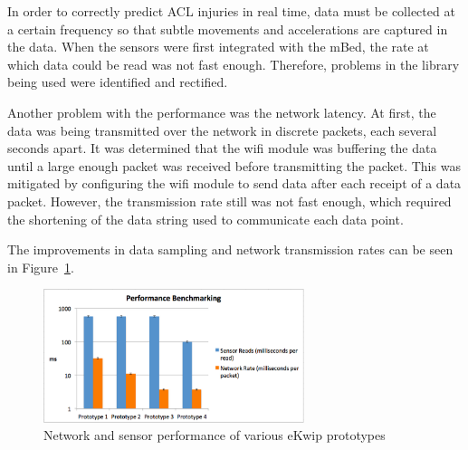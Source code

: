 In order to correctly predict ACL injuries in real time, data must be collected at a certain frequency so that subtle movements and accelerations are captured in the data. When the sensors were first integrated with the mBed, the rate at which data could be read was not fast enough. Therefore, problems in the library being used were identified and rectified.

Another problem with the performance was the network latency. At first, the data was being transmitted over the network in discrete packets, each several seconds apart. It was determined that the wifi module was buffering the data until a large enough packet was received before transmitting the packet. This was mitigated by configuring the wifi module to send data after each receipt of a data packet. However, the transmission rate still was not fast enough, which required the shortening of the data string used to communicate each data point.

The improvements in data sampling and network transmission rates can be seen in Figure~\ref{fig:graph}.

\begin{figure}[h]
  \begin{center}
    \includegraphics[width=3in]{images/graph.png}
  \end{center}
  \caption{Network and sensor performance of various eKwip prototypes}
  \label{fig:graph}
\end{figure}
